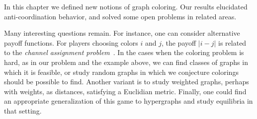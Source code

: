 In this chapter we defined new notions of graph coloring. Our results elucidated
anti-coordination behavior, and solved some open problems in related areas.

Many interesting questions remain.  For instance, one can consider alternative
payoff functions. For players choosing colors $i$ and $j$, the payoff $|i-j|$
is related to the \emph{channel assignment problem}~\cite{vandenHeuvel98}.  In
the cases when the coloring problem is hard, as in our problem and the example
above, we can find classes of graphs in which it is feasible, or study random
graphs in which we conjecture colorings should be possible to find.  Another
variant is to study weighted graphs, perhaps with weights, as distances,
satisfying a Euclidian metric. Finally, one could find an appropriate
generalization of this game to hypergraphs and study equilibria in that
setting.

